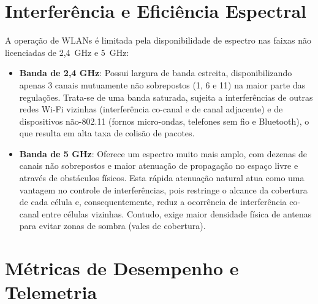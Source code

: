\section{Interferência e Eficiência Espectral}
\label{sec:fundamentacao_interferencia}

A operação de WLANs é limitada pela disponibilidade de espectro nas faixas não licenciadas de 2,4~GHz e 5~GHz:
\begin{itemize}
	\item \textbf{Banda de 2,4 GHz}: Possui largura de banda estreita, disponibilizando apenas 3 canais mutuamente não sobrepostos (1, 6 e 11) na maior parte das regulações. Trata-se de uma banda saturada, sujeita a interferências de outras redes Wi-Fi vizinhas (interferência co-canal e de canal adjacente) e de dispositivos não-802.11 (fornos micro-ondas, telefones sem fio e Bluetooth), o que resulta em alta taxa de colisão de pacotes.
	\item \textbf{Banda de 5 GHz}: Oferece um espectro muito mais amplo, com dezenas de canais não sobrepostos e maior atenuação de propagação no espaço livre e através de obstáculos físicos. Esta rápida atenuação natural atua como uma vantagem no controle de interferências, pois restringe o alcance da cobertura de cada célula e, consequentemente, reduz a ocorrência de interferência co-canal entre células vizinhas. Contudo, exige maior densidade física de antenas para evitar zonas de sombra (vales de cobertura).
\end{itemize}

\section{Métricas de Desempenho e Telemetria}
\label{sec:fundamentacao_metricas}

